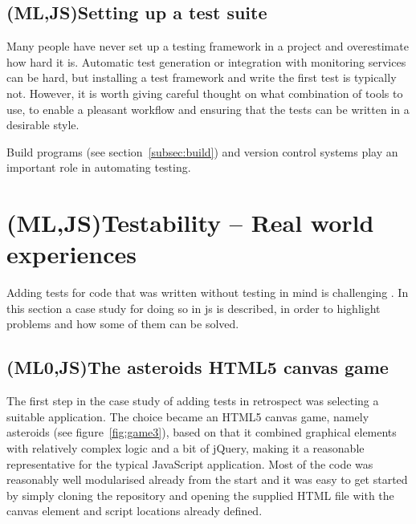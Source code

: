 \documentclass[11pt]{article}
\begin{document}
\subsection{(ML,JS)Setting up a test suite}

Many people have never set up a testing framework in a project and overestimate how hard it is. Automatic test generation or integration with monitoring services can be hard, but installing a test framework and write the first test is typically not. However, it is worth giving careful thought on what combination of tools to use, to enable a pleasant workflow and ensuring that the tests can be written in a desirable style.

Build programs (see section~\ref{subsec:build}) and version control systems play an important role in automating testing.


\section{(ML,JS)Testability -- Real world experiences}
\label{sec:testability}

Adding tests for code that was written without testing in mind is challenging \cite[p.~18]{Tddjs}. In this section a case study for doing so in \gls{js} is described, in order to highlight problems and how some of them can be solved.

\subsection{(ML0,JS)The asteroids HTML5 canvas game}
\label{subsec:asteriods}

The first step in the case study of adding tests in retrospect was selecting a suitable application. The choice became an HTML5 canvas game, namely asteroids (see figure~\ref{fig:game3}), based on that it combined graphical elements with relatively complex logic and a bit of jQuery, making it a reasonable representative for the typical JavaScript application. Most of the code was reasonably well modularised already from the start and it was easy to get started by simply cloning the repository and opening the supplied HTML file with the canvas element and script locations already defined.
\end{document}
